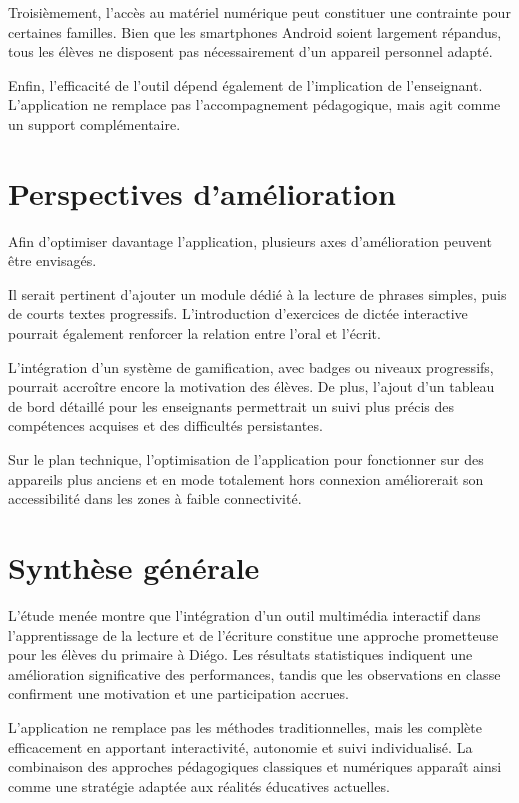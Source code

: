 \documentclass[a4paper,oneside,12pt]{book}
\begin{document}
Troisièmement, l'accès au matériel numérique peut constituer une contrainte pour certaines familles. Bien que les smartphones Android soient largement répandus, tous les élèves ne disposent pas nécessairement d'un appareil personnel adapté.

Enfin, l'efficacité de l'outil dépend également de l'implication de l'enseignant. L'application ne remplace pas l'accompagnement pédagogique, mais agit comme un support complémentaire.


\section{ Perspectives d'amélioration}
Afin d'optimiser davantage l'application, plusieurs axes d'amélioration peuvent être envisagés.

Il serait pertinent d'ajouter un module dédié à la lecture de phrases simples, puis de courts textes progressifs. L'introduction d'exercices de dictée interactive pourrait également renforcer la relation entre l'oral et l'écrit.

L'intégration d'un système de gamification, avec badges ou niveaux progressifs, pourrait accroître encore la motivation des élèves. De plus, l'ajout d'un tableau de bord détaillé pour les enseignants permettrait un suivi plus précis des compétences acquises et des difficultés persistantes.

Sur le plan technique, l'optimisation de l'application pour fonctionner sur des appareils plus anciens et en mode totalement hors connexion améliorerait son accessibilité dans les zones à faible connectivité.




\section{ Synthèse générale}
L'étude menée montre que l'intégration d'un outil multimédia interactif dans l'apprentissage de la lecture et de l'écriture constitue une approche prometteuse pour les élèves du primaire à Diégo. Les résultats statistiques indiquent une amélioration significative des performances, tandis que les observations en classe confirment une motivation et une participation accrues.

L'application ne remplace pas les méthodes traditionnelles, mais les complète efficacement en apportant interactivité, autonomie et suivi individualisé. La combinaison des approches pédagogiques classiques et numériques apparaît ainsi comme une stratégie adaptée aux réalités éducatives actuelles.
\end{document}
